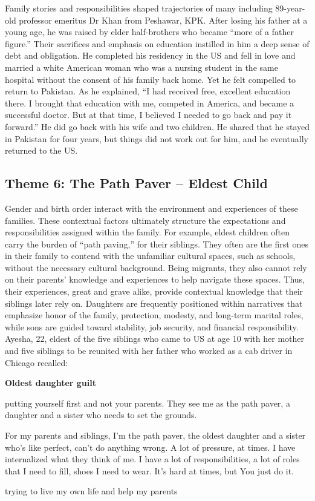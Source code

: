 Family stories and responsibilities shaped trajectories of many including 89-year-old professor emeritus Dr Khan from Peshawar, KPK. After losing his father at a young age, he was raised by elder half-brothers who became ``more of a father figure.'' Their sacrifices and emphasis on education instilled in him a deep sense of debt and obligation. He completed his residency in the US and fell in love and married a white American woman who was a nursing student in the same hospital without the consent of his family back home. Yet he felt compelled to return to Pakistan. As he explained, ``I had received free, excellent education there. I brought that education with me, competed in America, and became a successful doctor. But at that time, I believed I needed to go back and pay it forward.'' He did go back with his wife and two children. He shared that he stayed in Pakistan for four years, but things did not work out for him, and he eventually returned to the US.

\subsection{Theme 6: The Path Paver – Eldest Child}

Gender and birth order interact with the environment and experiences of these families. These contextual factors ultimately structure the expectations and responsibilities assigned within the family. For example, eldest children often carry the burden of ``path paving,'' for their siblings. They often are the first ones in their family to contend with the unfamiliar cultural spaces, such as schools, without the necessary cultural background. Being migrants, they also cannot rely on their parents' knowledge and experiences to help navigate these spaces. Thus, their experiences, great and grave alike, provide contextual knowledge that their siblings later rely on. Daughters are frequently positioned within narratives that emphasize honor of the family, protection, modesty, and long-term marital roles, while sons are guided toward stability, job security, and financial responsibility. Ayesha, 22, eldest of the five siblings who came to US at age 10 with her mother and five siblings to be reunited with her father who worked as a cab driver in Chicago recalled:

\textbf{Oldest daughter guilt }

\begin{FoundPoem}
putting yourself first 
and not your parents. 
They see me as the path paver, 
a daughter and a sister who needs to set the grounds. 

    For my parents and siblings, 
I'm the path paver, 
the oldest daughter and  
a sister 
who's like perfect, 
can't do anything wrong. 
A lot of pressure,        at times. 
I have internalized  		what they think of me. 
                   I have a lot of responsibilities, a lot of roles that I need to fill, 
shoes I need to wear. 
It's hard at times, but
You just do it. 

trying to live 
my own life 
and help my parents 
\end{FoundPoem}

